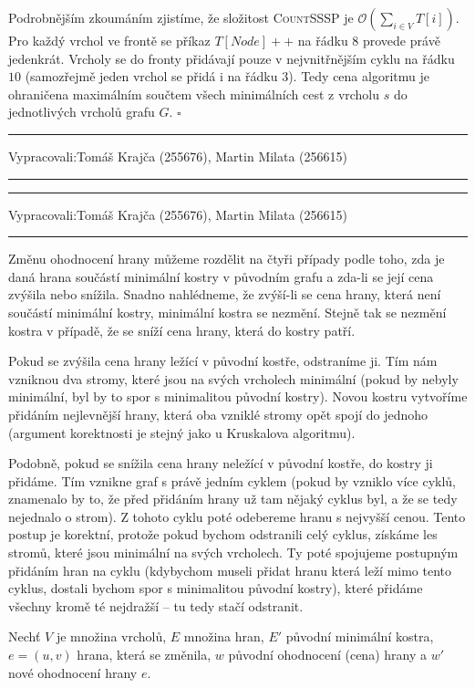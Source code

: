 \documentclass[12pt]{article}
\renewcommand{\O}{\mathcal{O}}
\newcommand{\zadani}[2]{
{\large
\noindent {\bf IB108 \hfill{} Sada #1, Příklad #2 \\[-4mm]}
\noindent\hrule
\vspace{2mm}
\noindent Vypracovali:\hfill{}Tomáš Krajča (255676), Martin Milata (256615)
\vspace{3mm}
\hrule
\bigskip\bigskip}
}
\begin{document}
\noindent
Podrobnějším zkoumáním zjistíme, že složitost \textsc{CountSSSP} je
$\O\left(\sum_{i\in V} T[i]\right)$. Pro každý vrchol ve frontě se příkaz
$T[Node]++$ na řádku $8$ provede právě jedenkrát. Vrcholy se do fronty přidávají
pouze v nejvnitřnějším cyklu na řádku $10$ (samozřejmě jeden vrchol se přidá i
na řádku $3$). Tedy cena algoritmu je ohraničena maximálním součtem všech
minimálních cest z vrcholu $s$ do jednotlivých vrcholů grafu $G$.
\hfill$\square$

\clearpage
\zadani{3}{3}

\clearpage
\zadani{3}{4}

\noindent
Změnu ohodnocení hrany můžeme rozdělit na čtyři případy podle toho, zda je daná hrana součástí
minimální kostry v původním grafu a zda-li se její cena zvýšila nebo snížila.  Snadno nahlédneme, že
zvýší-li se cena hrany, která není součástí minimální kostry, minimální kostra se nezmění. Stejně
tak se nezmění kostra v případě, že se sníží cena hrany, která do kostry patří.

Pokud se zvýšila cena hrany ležící v původní kostře, odstraníme ji. Tím nám vzniknou dva stromy,
které jsou na svých vrcholech minimální
(pokud by nebyly minimální, byl by to spor s minimalitou původní kostry). Novou kostru
vytvoříme přidáním nejlevnější hrany, která oba vzniklé stromy opět spojí do jednoho (argument
korektnosti je stejný jako u Kruskalova algoritmu).

Podobně, pokud se snížila cena hrany neležící v původní kostře, do kostry ji přidáme. Tím vznikne graf
s právě jedním cyklem (pokud by vzniklo více cyklů, znamenalo by to, že před přidáním hrany už tam nějaký
cyklus byl, a že se tedy nejednalo o strom). Z tohoto cyklu poté odebereme hranu s nejvyšší cenou. Tento
postup je korektní, protože pokud bychom odstranili celý cyklus, získáme les stromů, které jsou
minimální na svých vrcholech.
Ty poté spojujeme postupným přidáním hran na cyklu (kdybychom museli přidat hranu která leží mimo
tento cyklus, dostali bychom spor s minimalitou původní kostry), které přidáme všechny kromě té nejdražší
-- tu tedy stačí odstranit.

Nechť $V$ je množina vrcholů, $E$ množina hran, $E'$ původní minimální kostra, $e=(u,v)$ hrana, která
se změnila, $w$ původní ohodnocení (cena) hrany a $w'$ nové ohodnocení hrany $e$.
\end{document}
